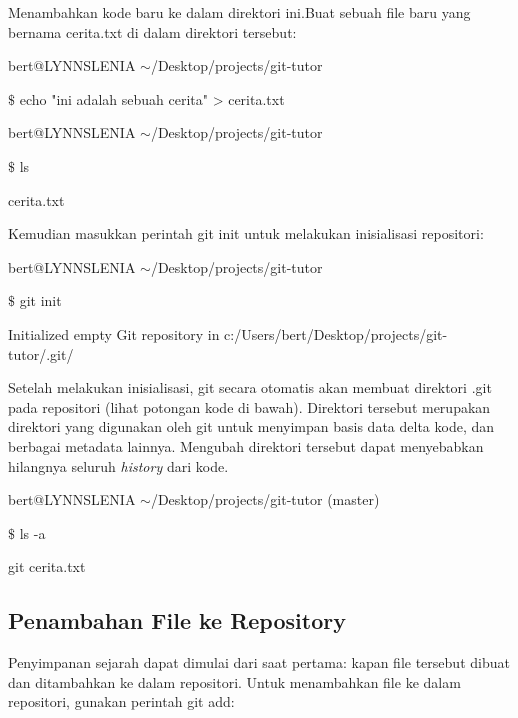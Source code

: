 \vspace{10pt}
Menambahkan kode baru ke dalam direktori ini.Buat sebuah file baru yang bernama cerita.txt di dalam direktori tersebut: \par
\noindent 
{\fontsize{10pt}{10pt}\selectfont bert@LYNNSLENIA  $  \sim  $/Desktop/projects/git-tutor} \par
\noindent 
{\fontsize{10pt}{10pt}\selectfont  $  \$  $ echo "ini adalah sebuah cerita" > cerita.txt} \par
\noindent 
{\fontsize{10pt}{10pt}\selectfont bert@LYNNSLENIA  $  \sim  $/Desktop/projects/git-tutor} \par
\noindent 
{\fontsize{10pt}{10pt}\selectfont  $  \$  $ ls} \par
\noindent 
{\fontsize{10pt}{10pt}\selectfont cerita.txt} \par
\vspace{12pt}
\noindent 
Kemudian masukkan perintah git init untuk melakukan inisialisasi repositori: \par
\noindent 
{\fontsize{10pt}{10pt}\selectfont bert@LYNNSLENIA  $  \sim  $/Desktop/projects/git-tutor} \par
\noindent 
{\fontsize{10pt}{10pt}\selectfont  $  \$  $ git init} \par
\noindent 
{\fontsize{10pt}{10pt}\selectfont Initialized empty Git repository in c:/Users/bert/Desktop/projects/git-tutor/.git/} \par
\vspace{12pt}
\hspace*{0.50in} Setelah melakukan inisialisasi, git secara otomatis akan membuat direktori .git pada repositori  (lihat potongan kode di bawah). Direktori tersebut merupakan direktori yang digunakan oleh git untuk menyimpan basis data delta kode, dan berbagai metadata lainnya. Mengubah direktori tersebut dapat menyebabkan hilangnya seluruh \emph{history} dari kode. \par
\noindent 
{\fontsize{10pt}{10pt}\selectfont bert@LYNNSLENIA  $  \sim  $/Desktop/projects/git-tutor (master)} \par
\noindent 
{\fontsize{10pt}{10pt}\selectfont  $  \$  $ ls -a} \par
\noindent 
{\fontsize{10pt}{10pt}\selectfont git  cerita.txt} 


\subsection{Penambahan File ke Repository} \par
\hspace*{0.50in} Penyimpanan sejarah dapat dimulai dari saat pertama: kapan file tersebut dibuat dan ditambahkan ke dalam repositori. Untuk menambahkan file ke dalam repositori, gunakan perintah git add: \par

